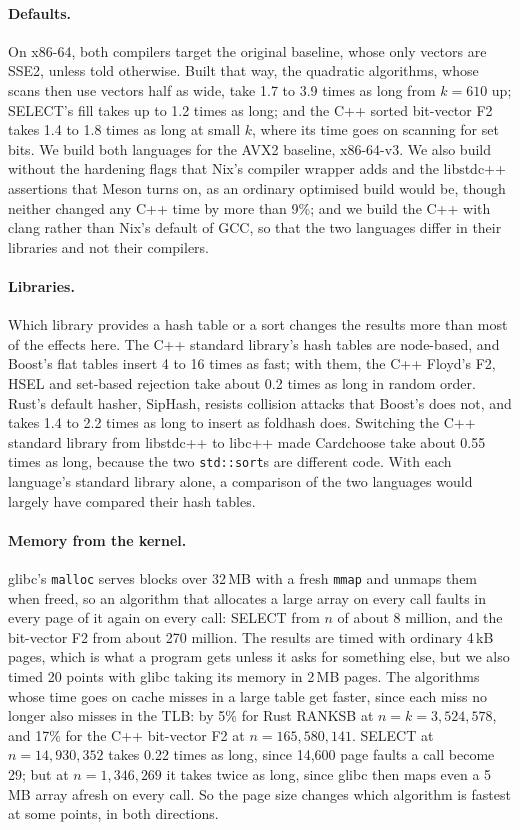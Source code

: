 \documentclass[letterpaper,11pt]{article}
\begin{document}
\paragraph{Defaults.} On x86-64, both compilers target the original
baseline, whose only vectors are SSE2, unless told otherwise. Built
that way, the quadratic algorithms, whose scans then use vectors half
as wide, take 1.7 to 3.9 times as long from \(k = 610\) up; SELECT's
fill takes up to 1.2 times as long; and the C++ sorted bit-vector F2
takes 1.4 to 1.8 times as long at small \(k\), where its time goes on
scanning for set bits. We build both languages for the AVX2 baseline,
x86-64-v3. We also build without the hardening flags that Nix's
compiler wrapper adds and the libstdc++ assertions that Meson turns on,
as an ordinary optimised build would be, though neither changed any C++
time by more than 9\%; and we build the C++ with clang rather than
Nix's default of GCC, so that the two languages differ in their
libraries and not their compilers.

\paragraph{Libraries.} Which library provides a hash table or a sort
changes the results more than most of the effects here. The C++
standard library's hash tables are node-based, and Boost's flat tables
insert 4 to 16 times as fast; with them, the C++ Floyd's F2, HSEL and
set-based rejection take about 0.2 times as long in random order.
Rust's default hasher, SipHash, resists collision attacks that Boost's
does not, and takes 1.4 to 2.2 times as long to insert as foldhash
does. Switching the
C++ standard library from libstdc++ to libc++ made Cardchoose take
about 0.55 times as long, because the two
\texttt{std::sort}s are different code. With each language's
standard library alone, a comparison of the two languages would largely
have compared their hash tables.

\paragraph{Memory from the kernel.} glibc's \texttt{malloc}
serves blocks over 32\,MB with a fresh \texttt{mmap} and unmaps
them when freed, so an algorithm that allocates a large array on every
call faults in every page of it again on every call: SELECT from \(n\)
of about 8 million, and the bit-vector F2 from about 270 million. The
results are timed with ordinary 4\,kB pages, which is what a program
gets unless it asks for something else, but we also timed 20 points
with glibc taking its memory in 2\,MB pages. The algorithms whose time
goes on cache misses in a large table get faster, since each miss no
longer also misses in the TLB: by 5\% for Rust RANKSB at
\(n = k = 3{,}524{,}578\), and 17\% for the C++ bit-vector F2 at
\(n = 165{,}580{,}141\). SELECT at \(n = 14{,}930{,}352\) takes 0.22
times as long, since 14,600 page faults a call become 29; but at
\(n = 1{,}346{,}269\) it takes twice as long, since glibc then maps
even a 5\,MB array afresh on every call. So the page size changes which
algorithm is fastest at some points, in both directions.
\end{document}
